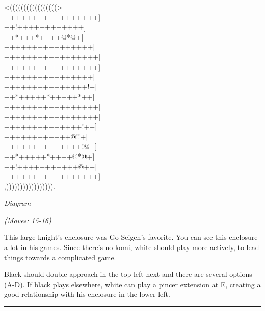 \documentclass[letterpaper,12pt]{memoir}
\newcounter{GoFigure}[part]
\newcommand{\gofigure}{%
 \stepcounter{GoFigure}
 \centerline{\textit{Diagram \arabic{GoFigure}}}
}
\newcommand{\subtext}[1]{\centerline{\textit{#1}}}
\begin{document}
\begin{minipage}[t]{240pt}
\label{Fujisawa-Hosai-vs-Go-Seigen-19430225:0:mainmove-15}
{\gnos
<(((((((((((((((((>\\
+++++++++++++++++]\\
++!++++++++++++]\\
++*+++*++++@*@+]\\
++++++++++++++++]\\
+++++++++++++++++]\\
+++++++++++++++++]\\
++++++++++++++++]\\
+++++++++++++++!+]\\
++*+++++*+++++*++]\\
+++++++++++++++++]\\
+++++++++++++++++]\\
++++++++++++++!++]\\
++++++++++++@!!+]\\
++++++++++++++!@+]\\
++*+++++*++++@*@+]\\
++!+++++++++++@++]\\
+++++++++++++++++]\\
,))))))))))))))))).\\
}
\gofigure
\subtext{(Moves: 15-16)}
\end{minipage}
\begin{minipage}[t]{268.19999999999993pt}
\setlength{\parskip}{0.5em}
This large knight's enclosure was Go Seigen's favorite. You can see this enclosure a lot in his games. Since there's no komi, white should play more actively, to lead things towards a complicated game.

Black should double approach in the top left next and there are several options (A-D). If black plays elsewhere, white can play a pincer extension at E, creating a good relationship with his enclosure in the lower left.


\end{minipage}
\vfill

\rule{\textwidth}{0.5pt}
\end{document}
